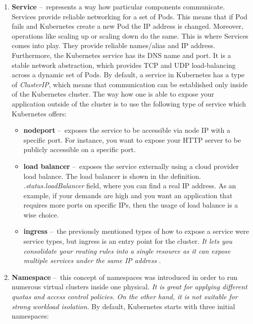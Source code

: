 \begin{enumerate}[itemsep=1mm, parsep=0pt]
    \item \textbf{Service} \---\ represents a way how particular components communicate. Services provide reliable networking for a set of Pods. This means that if Pod fails and Kubernetes create a new Pod the IP address is changed. Moreover, operations like scaling up or scaling down do the same. This is where Services comes into play. They provide reliable names/alias and IP address. Furthermore, the Kubernetes service has its DNS name and port. It is a stable network abstraction, which provides TCP and UDP load-balancing across a dynamic set of Pods. By default, a service in Kubernetes has a type of \emph{ClusterIP}, which means that communication can be established only inside of the Kubernetes cluster. The way how one is able to expose your application outside of the cluster is to use the following type of service which Kubernetes offers:
         \begin{itemize}[itemsep=1mm, parsep=0pt]
            \item \textbf{nodeport} \---\ exposes the service to be accessible via node IP with a specific port. For instance, you want to expose your HTTP server to be publicly accessible on a specific port.
            \item \textbf{load balancer} \---\  exposes the service externally using a cloud provider load balance. The load balancer is shown in the definition. \emph{.status.loadBalancer} field, where you can find a real IP address. As an example, if your demands are high and you want an application that requires more ports on specific IPs, then the usage of load balance is a wise choice.
            \item \textbf{ingress} \---\  the previously mentioned types of how to expose a service were service types, but ingress is an entry point for the cluster. \textit{It lets you consolidate your routing rules into a single resource as it can expose multiple services under the same IP address} \cite{ingress}.
        \end{itemize}
        
    \item \textbf{Namespace} \---\ this concept of namespaces was introduced in order to run numerous virtual clusters inside one physical. \emph{It is great for applying different quotas and access control policies. On the other hand, it is not suitable for strong workload isolation.} By default, Kubernetes starts with three initial namespaces:


\end{enumerate}
